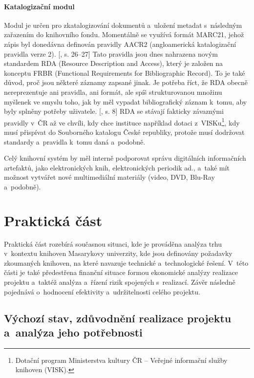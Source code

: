 \documentclass[
	11pt, oneside, printed, final, palatino
	microtype,
	table,   %
	lof,     %
	lot     %
]{fithesis3}
\newcommand{\citepages}[2]{[\cite{#2}, s. #1]}
\begin{document}
{\subsubsection{{\large Katalogizační modul}}
Modul je určen pro zkatalogizování dokumentů a~uložení metadat s~následným zařazením do knihovního fondu. Momentálně se využívá formát MARC21, jehož zápis byl donedávna definován pravidly AACR2 (angloamerická katalogizační pravidla verze 2). \citepages{26–27}{dilhofova_kratochvilova_lidmila_2013} Tato pravidla jsou dnes nahrazena novým standardem RDA (Resource Description and Access), který je založen na konceptu FRBR (Functional Requirements for Bibliographic Record). To je také důvod, proč jsou některé záznamy zapsané jinak. Je potřeba říct, že RDA obecně nereprezentuje ani pravidla, ani formát, ale spíš strukturovanou množinu myšlenek ve smyslu toho, jak by měl vypadat bibliografický záznam k~tomu, aby byly splněny potřeby uživatele. \citepages{8}{bilal_2014}
RDA se stávají fakticky závaznými pravidly v~ČR až ve chvíli, kdy chce instituce například dotaci z~VISKu\footnote{Dotační program Ministerstva kultury ČR – Veřejné informační služby knihoven (VISK).}, kdy musí přispívat do Souborného katalogu České republiky, protože musí dodržovat standardy a~pravidla k~tomu daná a~podobně.

Celý knihovní systém by měl interně podporovat správu digitálních informačních artefaktů, jako  elektronických knih, elektronických periodik ad., a~také mít možnost vytvářet nové multimediální materiály (video, DVD, Blu-Ray a~podobně).

\chapter{Praktická část}

Praktická část rozebírá současnou situaci, kde je prováděna analýza trhu v~kontextu knihoven Masarykovy univerzity, kde jsou definovány požadavky zkoumaných knihoven, na které navazuje technické a~technologické řešení. V~této části je také předestřena finanční situace formou ekonomické analýzy realizace projektu a~taktéž analýza a~řízení rizik spojených s~realizací. Závěr následně pojednává o~hodnocení efektivity a~udržitelnosti celého projektu.

\section{Výchozí stav, zdůvodnění realizace projektu a~analýza jeho potřebnosti}

}
\end{document}
